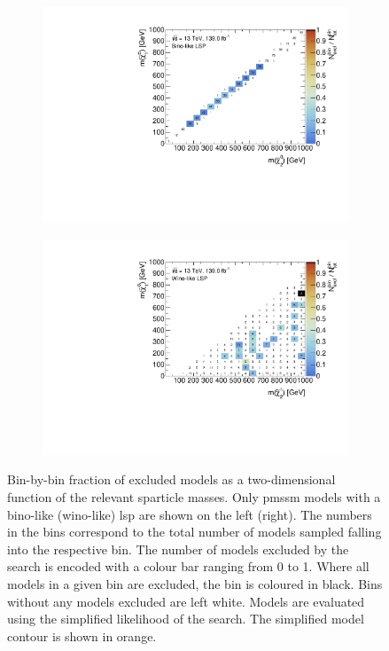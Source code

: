\begin{figure}
	\begin{subfigure}[b]{0.5\linewidth}
		\centering\includegraphics[width=\textwidth]{cut_bino_LSP/mchi1p_mchi20_contour}
	\end{subfigure}\hfill
	\begin{subfigure}[b]{0.5\linewidth}
		\centering\includegraphics[width=\textwidth]{cut_wino_LSP/mchi10_mchi2p_contour}
	\end{subfigure}\hfill	
	
	\caption{Bin-by-bin fraction of excluded models as a two-dimensional function of the relevant sparticle masses. Only \gls{pmssm} models with a bino-like (wino-like) \gls{lsp} are shown on the left (right). The numbers in the bins correspond to the total number of models sampled falling into the respective bin. The number of models excluded by the \onelepton search is encoded with a colour bar ranging from 0 to 1. Where all models in a given bin are excluded, the bin is coloured in black. Bins without any models excluded are left white. Models are evaluated using the simplified likelihood of the \onelepton search. The simplified model contour is shown in orange.}
	\label{fig:impact_electroweakinos_2D_bino_lsp}
\end{figure}

